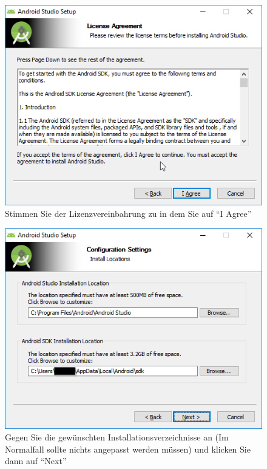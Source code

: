 \documentclass[a4paper,10pt,xetex]{article}
\begin{document}
\begin{figure}
  \centering
  \includegraphics[width=\textwidth]{Installation/1-3}
  \caption{Stimmen Sie der Lizenzvereinbahrung zu in dem Sie auf ``I Agree'' }
\end{figure}

\begin{figure}
  \centering
  \includegraphics[width=\textwidth]{Installation/1-4}
  \caption{Gegen Sie die gewünschten Installationsverzeichnisse an (Im Normalfall sollte nichts angepasst werden müssen) und klicken Sie dann auf ``Next'' }
\end{figure}
\end{document}
